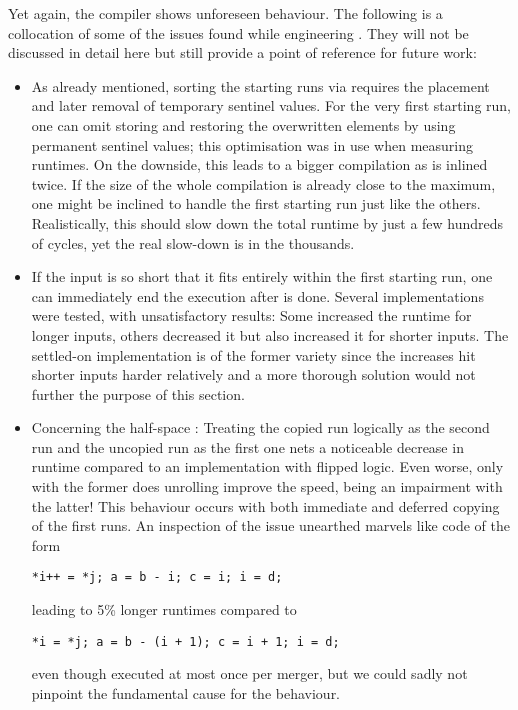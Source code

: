 Yet again, the compiler shows unforeseen behaviour.
The following is a collocation of some of the issues found while engineering \MS{}.
They will not be discussed in detail here but still provide a point of reference for future work:
\begin{itemize}
	\item
	As already mentioned, sorting the starting runs via \ShS{} requires the placement and later removal of temporary sentinel values.
	For the very first starting run, one can omit storing and restoring the overwritten elements by using permanent sentinel values;
	this optimisation was in use when measuring runtimes.
	On the downside, this leads to a bigger compilation as \ShS{} is inlined twice.
	If the size of the whole compilation is already close to the maximum, one might be inclined to handle the first starting run just like the others.
	Realistically, this should slow down the total runtime by just a few hundreds of cycles, yet the real slow-down is in the thousands.

	\item
	If the input is so short that it fits entirely within the first starting run, one can immediately end the execution after \ShS{} is done.
	Several implementations were tested, with unsatisfactory results:
	Some increased the runtime for longer inputs, others decreased it but also increased it for shorter inputs.
	The settled-on implementation is of the former variety since the increases hit shorter inputs harder relatively and a more thorough solution would not further the purpose of this section.

	\item
	Concerning the half-space \MS{}:
	Treating the copied run logically as the second run and the uncopied run as the first one nets a noticeable decrease in runtime compared to an implementation with flipped logic.
	Even worse, only with the former does unrolling improve the speed, being an impairment with the latter!
	This behaviour occurs with both immediate and deferred copying of the first runs.
	An inspection of the issue unearthed marvels like code of the form
	\begin{center}
		\vspace{-\baselineskip}
		\texttt{*i++ = *j; a = b - i; c = i; i = d;}
	\end{center}
	leading to 5\% longer runtimes compared to
	\begin{center}
		\texttt{*i = *j; a = b - (i + 1); c = i + 1; i = d;}
	\end{center}
	even though executed at most once per merger, but we could sadly not pinpoint the fundamental cause for the behaviour.
\end{itemize}



